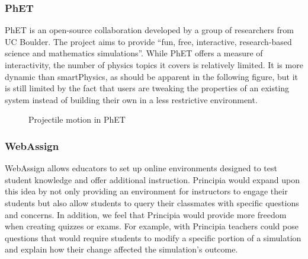 \subsubsection{PhET}

PhET is an open-source collaboration developed by a group of researchers from UC Boulder. The project aims to provide ``fun, free, interactive, research-based science and mathematics simulations''.  While PhET offers a measure of interactivity, the number of physics topics it covers is relatively limited. It is more dynamic than smartPhysics, as should be apparent in the following figure, but it is still limited by the fact that users are tweaking the properties of an existing system instead of building their own in a less restrictive environment.

\clearpage
\BgThispage


\begin{figure}[H]
	\centering
    \caption{Projectile motion in PhET \cite{PhET}}
\end{figure}

\subsubsection{WebAssign}

WebAssign allows educators to set up online environments designed to test student knowledge and offer additional instruction.  Principia would expand upon this idea by not only providing an environment for instructors to engage their students but also allow students to query their classmates with specific questions and concerns.  In addition, we feel that Principia would provide more freedom when creating quizzes or exams.  For example, with Principia teachers could pose questions that would require students to modify a specific portion of a simulation and explain how their change affected the simulation's outcome.  

